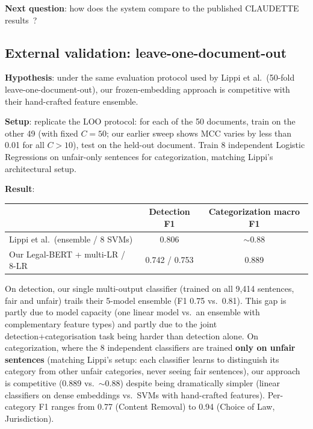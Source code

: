 \documentclass[11pt,a4paper]{article}
\begin{document}
\textbf{Next question}: how does the system compare to the published
CLAUDETTE results~\cite{lippi2019claudette}?

\subsection{External validation: leave-one-document-out}

\textbf{Hypothesis}: under the same evaluation protocol used by Lippi et
al.\ (50-fold leave-one-document-out), our frozen-embedding approach is
competitive with their hand-crafted feature ensemble.

\textbf{Setup}: replicate the LOO protocol: for each of the 50 documents,
train on the other 49 (with fixed $C=50$; our earlier sweep shows MCC
varies by less than 0.01 for all $C > 10$), test on the held-out
document.  Train 8 independent Logistic Regressions on unfair-only
sentences for categorization, matching Lippi's architectural setup.

\textbf{Result}:

\begin{center}
\begin{tabular}{l c c}
\hline
 & Detection F1 & Categorization macro F1 \\
\hline
Lippi et al.\ (ensemble / 8 SVMs)       & 0.806 & $\sim$0.88 \\
Our Legal-BERT + multi-LR / 8-LR        & 0.742 / 0.753 & 0.889 \\
\hline
\end{tabular}
\end{center}

On detection, our single multi-output classifier (trained on all 9,414
sentences, fair and unfair) trails their 5-model ensemble (F1 0.75 vs.\
0.81).  This gap is partly due to model capacity (one linear model vs.\
an ensemble with complementary feature types) and partly due to the
joint detection+categorisation task being harder than detection alone.
On categorization, where the 8 independent classifiers are trained
\textbf{only on unfair sentences} (matching Lippi's setup: each classifier
learns to distinguish its category from other unfair categories, never
seeing fair sentences), our approach is competitive (0.889 vs.\ $\sim$0.88)
despite being dramatically simpler (linear classifiers on dense
embeddings vs.\ SVMs with hand-crafted features).  Per-category F1 ranges
from 0.77 (Content Removal) to 0.94 (Choice of Law, Jurisdiction).

\end{document}
